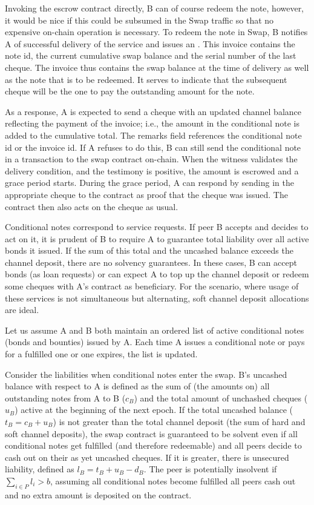 Invoking the escrow contract directly, B can of course redeem the note, however, it would be nice if this could be subsumed in the Swap traffic so that no expensive on-chain operation is necessary. 
To redeem the note in Swap, B notifies A of successful delivery of the service and issues an . This invoice contains the note id, the current cumulative swap balance and the serial number of the last cheque. The invoice thus contains the swap balance at the time of delivery as well as the note that is to be redeemed. It serves to indicate that the subsequent cheque will be the one to pay the outstanding amount for the note.

As a response, A is expected to send a cheque with an updated channel balance reflecting the payment of the invoice; i.e., the amount in the conditional note is added to the cumulative total. The remarks field references the conditional note id or the invoice id. If A refuses to do this, B can still send the conditional note in a transaction to the swap contract on-chain. When the witness validates the delivery condition, and the testimony is positive, the amount is escrowed and a grace period starts. During the grace period, A can respond by sending in the appropriate cheque to the contract as proof that the cheque was issued. The contract then also acts on the cheque as usual.

Conditional notes correspond to service requests. If peer B accepts and decides to act on it, it is prudent of B to require A to guarantee total liability over all active bonds it issued. If the sum of this total and the uncashed balance exceeds the channel deposit, there are no solvency guarantees. In these cases, B can accept bonds (as loan requests) or can expect A to top up the channel deposit or redeem some cheques with A's contract as  beneficiary. For the scenario, where usage of these services is not simultaneous but alternating, soft channel deposit allocations 
are ideal.

Let us assume A and B both maintain an ordered list of active conditional notes (bonds and bounties) issued by A.
Each time A issues a conditional note or pays for a fulfilled one or one expires, the list is updated.

Consider the liabilities when conditional notes enter the swap. 
B's uncashed balance with respect to A is defined as the sum of (the amounts on) all outstanding notes from A to B ($c_B$) and the total amount of unchashed cheques ($u_B$) active at the beginning of the next epoch.
If the total uncashed balance ($t_B=c_B+u_B$) is not greater than the total channel deposit (the sum of hard and soft channel deposits), the swap contract is guaranteed to be solvent even if all conditional notes get fulfilled (and therefore redeemable) and all peers decide to cash out on their as yet uncashed cheques. If it is greater, there is unsecured liability, defined as $l_B = t_B + u_B - d_B$. The peer is potentially insolvent if $\sum_{i\in P}l_i > b$, assuming all conditional notes become fulfilled all peers cash out and no extra amount is deposited on the contract. 

